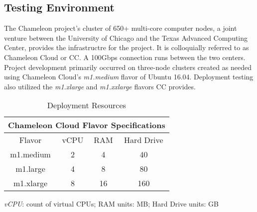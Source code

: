 \documentclass[9pt,twocolumn,twoside]{../../styles/osajnl}
\begin{document}
\subsection{Testing Environment}
The Chameleon project's cluster of 650+ multi-core computer nodes, a joint venture between the University of Chicago and the Texas Advanced Computing Center, provides the infrastructre for the project.  It is colloquially referred to as Chameleon Cloud or CC.  A 100Gbps connection runs between the two centers. Project development primarily occurred on three-node clusters created as needed using Chameleon Cloud's \textit{m1.medium} flavor of Ubuntu 16.04.  Deployment testing also utilized the \textit{m1.xlarge} and \textit{m1.xxlarge} flavors CC provides.  \begin{table} [htbp]
  \begin{threeparttable}
  \centering
  \caption{Deployment Resources}
    \begin{tabular}{cccc}
      \multicolumn{4}{c}{\bf Chameleon Cloud Flavor Specifications}\\ \hline Flavor & vCPU & RAM & Hard Drive \\ \hline m1.medium & 2 & 4 & 40\\ m1.large & 4 & 8 & 80 \\ m1.xlarge & 8 & 16 & 160 \\ \hline
    \end{tabular}
    \begin{tablenotes}
      \small
      \item \textit{vCPU}: count of virtual CPUs; RAM units: MB; Hard Drive units: GB 
    \end{tablenotes}
  \end{threeparttable}
\end{table}
\end{document}
